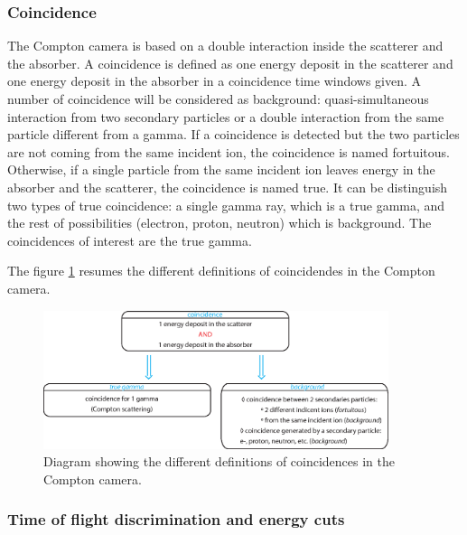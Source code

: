 \newpage
\subsubsection{Coincidence}
\label{subsubsection:definition_beam_structure_CC_hadrontherapy_Geant4}

The Compton camera is based on a double interaction inside the scatterer and the absorber. A coincidence is defined as one energy deposit in the scatterer and one energy deposit in the absorber in a coincidence time windows given. A number of coincidence will be considered as background: quasi-simultaneous interaction from two secondary particles or a double interaction from the same particle different from a gamma.\newline
If a coincidence is detected but the two particles are not coming from the same incident ion, the coincidence is named fortuitous.
Otherwise, if a single particle from the same incident ion leaves energy in the absorber and the scatterer, the coincidence is named true.\newline
It can be distinguish two types of true coincidence: a single gamma ray, which is a true gamma, and the rest of possibilities (electron, proton, neutron) which is background. The coincidences of interest are the true gamma. 

The figure \ref{fig:fig_explication_coincidence_CC_simulation_Hadronth} resumes the different definitions of coincidendes in the Compton camera.
	\begin{figure} [!hbtp]	
	\centering
	\includegraphics[width=0.9\textwidth]{./Figure/Schema_coincidence_EN.eps}
	\caption{Diagram showing the different definitions of coincidences in the Compton camera.}
	 \label{fig:fig_explication_coincidence_CC_simulation_Hadronth}
	\end{figure}


\subsubsection{Time of flight discrimination and energy cuts}

